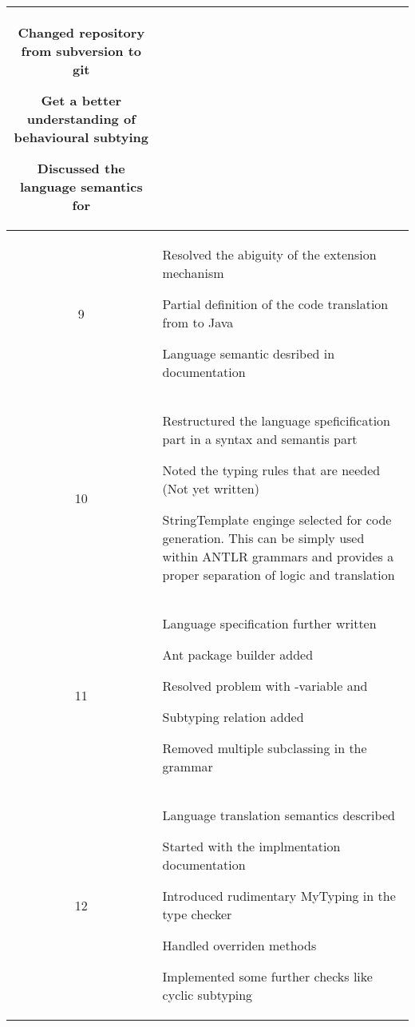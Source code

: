 \begin{center}
\begin{longtable}{|c|p{12cm}|}
\begin{journal}
	\item Changed repository from subversion to git
	\item Get a better understanding of behavioural subtying
	\item Discussed the language semantics for \mytype
\end{journal}
\\ \hline
9 &
\begin{journal}
	\item Resolved the abiguity of the extension mechanism
	\item Partial definition of the code translation from \ooplss to Java
	\item Language semantic desribed in documentation
\end{journal}
\\ \hline
10 &
\begin{journal}
	\item Restructured the language speficification part in a syntax and semantis part
	\item Noted the typing rules that are needed (Not yet written)
	\item StringTemplate enginge selected for code generation. This can be simply used within ANTLR grammars and provides a proper separation of logic and translation
\end{journal}
\\ \hline
11 &
\begin{journal}
	\item Language specification further written
	\item Ant package builder added
	\item Resolved problem with \self-variable and \mytype
	\item Subtyping relation added
	\item Removed multiple subclassing in the grammar
\end{journal}
\\ \hline
12 &
\begin{journal}
	\item Language translation semantics described
	\item Started with the implmentation documentation
	\item Introduced rudimentary MyTyping in the type checker
	\item Handled overriden methods
	\item Implemented some further checks like cyclic subtyping
\end{journal}
\\ \hline

\end{longtable}
\end{center}
